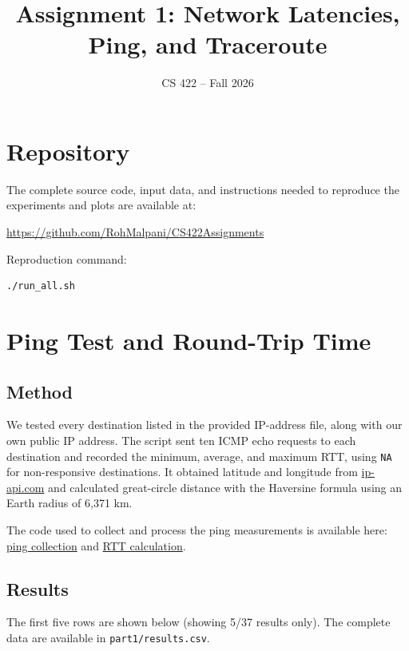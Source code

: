 \documentclass[11pt]{article}
\title{Assignment 1: Network Latencies, Ping, and Traceroute}
\author{\studentname}
\date{CS 422 -- Fall 2026}
\newcommand{\repolink}{https://github.com/RohMalpani/CS422Assignments}
\newcommand{\codelink}[2]{\href{\repolink/blob/main/#2}{#1}}
\begin{document}
\maketitle

\section*{Repository}

The complete source code, input data, and instructions needed to reproduce the
experiments and plots are available at:
\begin{center}
    \url{\repolink}
\end{center}

\noindent Reproduction command:
\begin{verbatim}
./run_all.sh
\end{verbatim}

\section{Ping Test and Round-Trip Time}

\subsection{Method}

We tested every destination listed in the provided IP-address file, along with
our own public IP address.  The script sent ten ICMP echo requests to each
destination and recorded the minimum, average, and maximum RTT, using
\texttt{NA} for non-responsive destinations.  It obtained latitude and
longitude from \url{ip-api.com} and calculated great-circle distance with the
Haversine formula using an Earth radius of 6,371 km.

The code used to collect and process the ping measurements is available here:
\codelink{ping collection}{assignment1/part1/ping.sh\#L55-L56} and
\codelink{RTT calculation}{assignment1/part1/ping.sh\#L58-L66}.

\subsection{Results}

The first five rows are shown below (showing 5/37 results only).  The complete
data are available in \texttt{part1/results.csv}.
\end{document}
